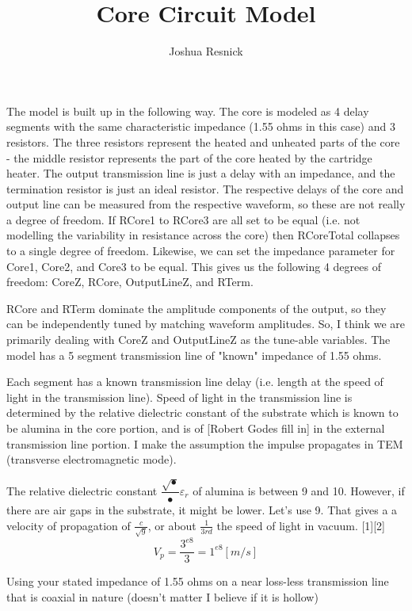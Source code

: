 \documentclass{article}
\title{Core Circuit Model }
\author{Joshua Resnick}
\begin{document}
\maketitle


The model is built up in the following way. The core is modeled as 4 delay segments with the same characteristic impedance (1.55 ohms in this case) and 3 resistors. The three resistors represent the heated and unheated parts of the core - the middle resistor represents the part of the core heated by the cartridge heater. The output transmission line is just a delay with an impedance, and the termination resistor is just an ideal resistor. The respective delays of the core and output line can be measured from the respective waveform, so these are not really a degree of freedom. If RCore1 to RCore3 are all set to be equal (i.e. not modelling the variability in resistance across the core) then RCoreTotal collapses to a single degree of freedom. Likewise, we can set the impedance parameter for Core1, Core2, and Core3 to be equal. This gives us the following 4 degrees of freedom:
CoreZ, RCore, OutputLineZ, and RTerm.

RCore and RTerm dominate the amplitude components of the output, so they can be independently tuned by matching waveform amplitudes. So, I think we are primarily dealing with CoreZ and OutputLineZ as the tune-able variables. 
The model has a 5 segment transmission line of "known" impedance of 1.55 ohms.

Each segment has a known transmission line delay (i.e. length at the speed of light in the transmission line).  Speed of light in the transmission line is determined by the relative dielectric constant of the substrate which is known to be alumina in the core portion, and is of [Robert Godes fill in] in the external transmission line portion. I make the assumption the impulse propagates in TEM (transverse electromagnetic mode).

The relative dielectric constant $\dfrac{\sqrt{•}}{•}\varepsilon_{r}$ of alumina is between 9 and 10.  However, if there are air gaps in the substrate, it might be lower.  Let's use 9.  That gives a a velocity of propagation of $\frac{c}{\sqrt{9}}$, or about $\frac{1}{3rd}$ the speed of light in vacuum. [1][2]
\begin{equation}
V_{p} = \frac{3^{e8}}{3} = 1^{e8} [m/s] \label{1}%
\end{equation}


Using your stated impedance of 1.55 ohms on a near loss-less transmission line that is coaxial in nature (doesn't matter I believe if it is hollow)
\end{document}
